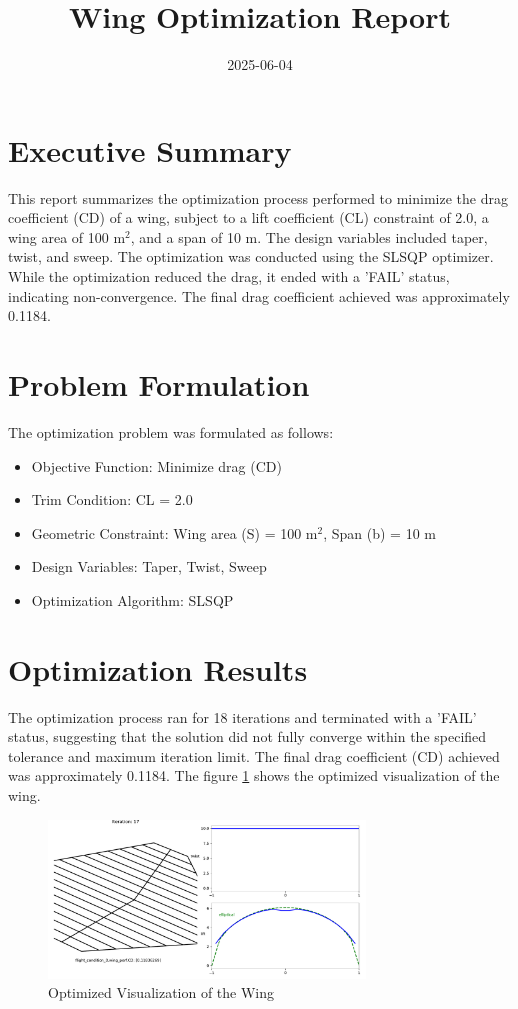 \documentclass{article}
\title{Wing Optimization Report}
\date{2025-06-04}
\begin{document}
\maketitle

\section{Executive Summary}
This report summarizes the optimization process performed to minimize the drag coefficient (CD) of a wing, subject to a lift coefficient (CL) constraint of 2.0, a wing area of 100 m$^2$, and a span of 10 m. The design variables included taper, twist, and sweep. The optimization was conducted using the SLSQP optimizer. While the optimization reduced the drag, it ended with a 'FAIL' status, indicating non-convergence. The final drag coefficient achieved was approximately 0.1184.

\section{Problem Formulation}
The optimization problem was formulated as follows:
\begin{itemize}
    \item Objective Function: Minimize drag (CD)
    \item Trim Condition: CL = 2.0
    \item Geometric Constraint: Wing area (S) = 100 m$^2$, Span (b) = 10 m
    \item Design Variables: Taper, Twist, Sweep
    \item Optimization Algorithm: SLSQP
\end{itemize}

\section{Optimization Results}
The optimization process ran for 18 iterations and terminated with a 'FAIL' status, suggesting that the solution did not fully converge within the specified tolerance and maximum iteration limit. The final drag coefficient (CD) achieved was approximately 0.1184. The figure \ref{fig:OptimizedWing} shows the optimized visualization of the wing.

\begin{figure}[h!]
    \centering
    \includegraphics[width=0.75\textwidth]{./Optimized_Wing.pdf}
    \caption{Optimized Visualization of the Wing}
    \label{fig:OptimizedWing}
\end{figure}
\end{document}
